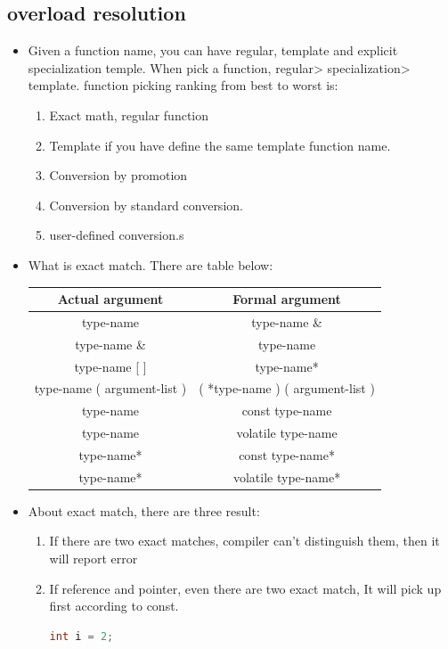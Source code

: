 \documentclass[a4paper,12pt,twoside]{book}
\begin{document}
\subsection{overload resolution}
\begin{itemize}
\item Given a function name, you can have regular, template and explicit specialization temple. When pick a function, regular> specialization> template. function picking ranking from best to worst is:
\begin{enumerate}
\item Exact math, regular function
\item Template if you have define the same template function name.
\item Conversion by promotion
\item Conversion by standard conversion.
\item user-defined conversion.s
\end{enumerate}

\item What is exact match. There are table below:

\begin{tabular}{|c|c|}
\hline
Actual argument & Formal argument \\
\hline
type-name & type-name \& \\
\hline
type-name \& & type-name \\ \hline
type-name [ ] &  type-name* \\ \hline
type-name ( argument-list ) & ( *type-name ) ( argument-list ) \\ \hline
type-name  & const type-name \\ \hline
type-name  &  volatile  type-name \\ \hline
type-name*  & const type-name*  \\ \hline
type-name*  & volatile  type-name*  \\  \hline
\end{tabular}

\item About exact match, there are three result:
\begin{enumerate}
\item If there are two exact matches, compiler can't distinguish them, then it will report error
\item If reference and pointer, even there are two exact match, It will pick up first according to const.
\begin{lstlisting}[frame=single, language=c++]
int i = 2;


\end{lstlisting}
\end{enumerate}
\end{itemize}
\end{document}
